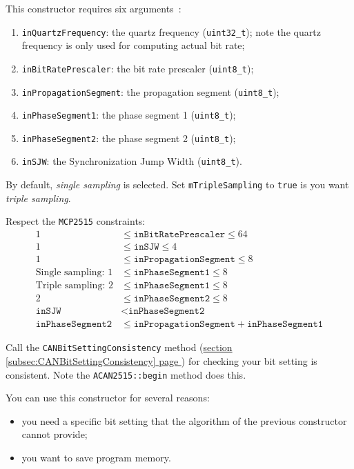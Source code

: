 \documentclass[10pt, a4paper, obeyspaces]{extarticle}
\newcommand\refSubsectionPage[1]{\hyperref[subsec:#1]{section \ref*{subsec:#1} page \pageref{subsec:#1}}}
\begin{document}
This constructor requires six arguments~:
\begin{enumerate}
  \item \texttt{inQuartzFrequency}: the quartz frequency (\texttt{uint32\_t}); note the quartz frequency is only used for computing actual bit rate;
  \item \texttt{inBitRatePrescaler}: the bit rate prescaler (\texttt{uint8\_t});
  \item \texttt{inPropagationSegment}: the propagation segment (\texttt{uint8\_t});
  \item \texttt{inPhaseSegment1}: the phase segment 1 (\texttt{uint8\_t});
  \item \texttt{inPhaseSegment2}: the phase segment 2 (\texttt{uint8\_t});
  \item \texttt{inSJW}: the Synchronization Jump Width (\texttt{uint8\_t}).
\end{enumerate}

By default, \emph{single sampling} is selected. Set \texttt{mTripleSampling} to \texttt{true} is you want \emph{triple sampling}.

Respect the \texttt{MCP2515} constraints:
\begin{align*}
1 & \leqslant \texttt{inBitRatePrescaler} \leqslant 64 \\
1 & \leqslant \texttt{inSJW} \leqslant 4 \\
1 & \leqslant \texttt{inPropagationSegment} \leqslant 8 \\
\text{Single sampling: }1 & \leqslant \texttt{inPhaseSegment1} \leqslant 8\\
\text{Triple sampling: }2 & \leqslant \texttt{inPhaseSegment1} \leqslant 8\\
2 & \leqslant \texttt{inPhaseSegment2} \leqslant 8 \\
\texttt{inSJW} &<\texttt{inPhaseSegment2}\\
\texttt{inPhaseSegment2} & \leqslant \texttt{inPropagationSegment} + \texttt{inPhaseSegment1}
\end{align*}

Call the \texttt{CANBitSettingConsistency} method (\refSubsectionPage{CANBitSettingConsistency}) for checking your bit setting is consistent. Note the \texttt{ACAN2515::begin} method does this.

You can use this constructor for several reasons:
\begin{itemize}
  \item you need a specific bit setting that the algorithm of the previous constructor cannot provide;
  \item you want to save program memory.
\end{itemize}
\end{document}
